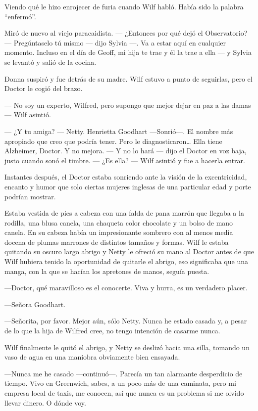 Viendo qué le hizo enrojecer de furia cuando Wilf habló. Había sido la
palabra ``enfermó''.

Miró de nuevo al viejo paracaidista. --- ¿Entonces por qué dejó el
Observatorio? --- Pregúntaselo tú mismo --- dijo Sylvia ---. Va a estar
aquí en cualquier momento. Incluso en el día de Geoff, mi hija te trae y
él la trae a ella --- y Sylvia se levantó y salió de la cocina.

Donna suspiró y fue detrás de su madre. Wilf estuvo a punto de
seguirlas, pero el Doctor le cogió del brazo.

--- No soy un experto, Wilfred, pero supongo que mejor dejar en paz a
las damas --- Wilf asintió.

--- ¿Y tu amiga? --- Netty. Henrietta Goodhart ---Sonrió---. El nombre
más apropiado que creo que podría tener. Pero le diagnosticaron\ldots{}
Ella tiene Alzheimer, Doctor. Y no mejora. --- Y no lo hará --- dijo el
Doctor en voz baja, justo cuando sonó el timbre. --- ¿Es ella? --- Wilf
asintió y fue a hacerla entrar.

Instantes después, el Doctor estaba sonriendo ante la visión de la
excentricidad, encanto y humor que solo ciertas mujeres inglesas de una
particular edad y porte podrían mostrar.

Estaba vestida de pies a cabeza con una falda de pana marrón que llegaba
a la rodilla, una blusa canela, una chaqueta color chocolate y un bolso
de mano canela. En su cabeza había un impresionante sombrero con al
menos media docena de plumas marrones de distintos tamaños y formas.
Wilf le estaba quitando su oscuro largo abrigo y Netty le ofreció su
mano al Doctor antes de que Wilf hubiera tenido la oportunidad de
quitarle el abrigo, eso significaba que una manga, con la que se hacían
los apretones de manos, seguía puesta.

---Doctor, qué maravilloso es el conocerte. Viva y hurra, es un
verdadero placer.

---Señora Goodhart.

---Señorita, por favor. Mejor aún, sólo Netty. Nunca he estado casada y,
a pesar de lo que la hija de Wilfred cree, no tengo intención de casarme
nunca.

Wilf finalmente le quitó el abrigo, y Netty se deslizó hacia una silla,
tomando un vaso de agua en una maniobra obviamente bien ensayada.

---Nunca me he casado ---continuó---. Parecía un tan alarmante
desperdicio de tiempo. Vivo en Greenwich, sabes, a un poco más de una
caminata, pero mi empresa local de taxis, me conocen, así que nunca es
un problema si me olvido llevar dinero. O dónde voy.

